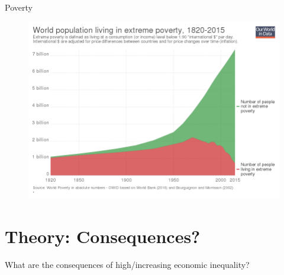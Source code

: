 \documentclass{beamer}
\begin{document}
\begin{frame}{Poverty} 
\begin{figure}
    \centering
    \includegraphics[width=\textwidth]{../img/poverty.png} 
\end{figure}
\end{frame}{}

\section{Theory: Consequences?}

\begin{frame}{}
\centering
\alert{\Large{What are the consequences of high/increasing economic inequality?}}





\end{frame}{}
\end{document}
